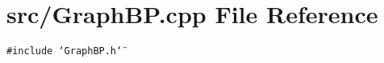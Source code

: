 \section{src/GraphBP.cpp File Reference}
\label{GraphBP_8cpp}
{\tt \#include \char`\"{}GraphBP.h\char`\"{}}\par
